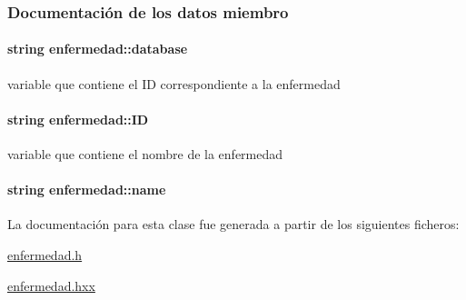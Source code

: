\subsubsection{Documentación de los datos miembro}
\paragraph[{\texorpdfstring{database}{database}}]{\setlength{\rightskip}{0pt plus 5cm}string enfermedad\+::database\hspace{0.3cm}{\ttfamily [private]}}\hypertarget{classenfermedad_a3684b7ec850d4c9357dd21bdd5e02803}{}\label{classenfermedad_a3684b7ec850d4c9357dd21bdd5e02803}


variable que contiene el ID correspondiente a la enfermedad 

\paragraph[{\texorpdfstring{ID}{ID}}]{\setlength{\rightskip}{0pt plus 5cm}string enfermedad\+::\+ID\hspace{0.3cm}{\ttfamily [private]}}\hypertarget{classenfermedad_a689cdbd469ecc28e045bda2f62a229d2}{}\label{classenfermedad_a689cdbd469ecc28e045bda2f62a229d2}


variable que contiene el nombre de la enfermedad 

\paragraph[{\texorpdfstring{name}{name}}]{\setlength{\rightskip}{0pt plus 5cm}string enfermedad\+::name\hspace{0.3cm}{\ttfamily [private]}}\hypertarget{classenfermedad_ad7c4204057028a73bde6022678c6813e}{}\label{classenfermedad_ad7c4204057028a73bde6022678c6813e}


La documentación para esta clase fue generada a partir de los siguientes ficheros\+:\begin{DoxyCompactItemize}
\item 
\hyperlink{enfermedad_8h}{enfermedad.\+h}\item 
\hyperlink{enfermedad_8hxx}{enfermedad.\+hxx}\end{DoxyCompactItemize}
